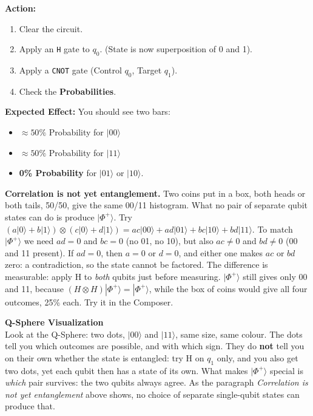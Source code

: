 \documentclass[a4paper,11pt]{article}
\begin{document}
\begin{studentbox}
\textbf{Action:}
\begin{enumerate}
    \item Clear the circuit.
    \item Apply an \texttt{H} gate to $q_0$. (State is now superposition of 0 and 1).
    \item Apply a \texttt{CNOT} gate (Control $q_0$, Target $q_1$).
    \item Check the \textbf{Probabilities}.
\end{enumerate}
\textbf{Expected Effect:}
You should see two bars:
\begin{itemize}
    \item $\approx 50\%$ Probability for $|00\rangle$
    \item $\approx 50\%$ Probability for $|11\rangle$
    \item \textbf{0\% Probability} for $|01\rangle$ or $|10\rangle$.
\end{itemize}
\end{studentbox}

\noindent\textbf{Correlation is not yet entanglement.} Two coins put in a box, both heads or both
tails, 50/50, give the same 00/11 histogram. What no pair of separate qubit states can do is
produce $|\Phi^+\rangle$. Try $(a|0\rangle + b|1\rangle)\otimes(c|0\rangle + d|1\rangle) =
ac|00\rangle + ad|01\rangle + bc|10\rangle + bd|11\rangle$. To match $|\Phi^+\rangle$ we need
$ad = 0$ and $bc = 0$ (no 01, no 10), but also $ac \neq 0$ and $bd \neq 0$ (00 and 11 present).
If $ad = 0$, then $a = 0$ or $d = 0$, and either one makes $ac$ or $bd$ zero: a contradiction, so
the state cannot be factored. The difference is measurable: apply H to \emph{both} qubits just
before measuring. $|\Phi^+\rangle$ still gives only 00 and 11, because
$(H\otimes H)|\Phi^+\rangle = |\Phi^+\rangle$, while the box of coins would give all four
outcomes, 25\% each. Try it in the Composer.

\begin{composerbox}
\textbf{Q-Sphere Visualization}\\
Look at the Q-Sphere: two dots, $|00\rangle$ and $|11\rangle$, same size, same colour. The dots
tell you which outcomes are possible, and with which sign. They do \textbf{not} tell you on their
own whether the state is entangled: try H on $q_1$ only, and you also get two dots, yet each qubit
then has a state of its own. What makes $|\Phi^+\rangle$ special is \emph{which} pair survives: the
two qubits always agree. As the paragraph \emph{Correlation is not yet entanglement} above shows,
no choice of separate single-qubit states can produce that.
\end{composerbox}
\end{document}
